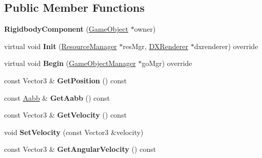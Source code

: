 \subsection*{Public Member Functions}
\begin{DoxyCompactItemize}
\item 
\mbox{\label{classRigidbodyComponent_ac10d3006d0d2324280f339f8adf3c5bc}} 
{\bfseries Rigidbody\+Component} (\hyperlink{classGameObject}{Game\+Object} $\ast$owner)
\item 
\mbox{\label{classRigidbodyComponent_a3fe46e628d20481031089e0e3e6bc6ee}} 
virtual void {\bfseries Init} (\hyperlink{classResourceManager}{Resource\+Manager} $\ast$res\+Mgr, \hyperlink{classDXRenderer}{D\+X\+Renderer} $\ast$dxrenderer) override
\item 
\mbox{\label{classRigidbodyComponent_af18ec4b42ca0c975e79f228fb515f2ac}} 
virtual void {\bfseries Begin} (\hyperlink{classGameObjectManager}{Game\+Object\+Manager} $\ast$go\+Mgr) override
\item 
\mbox{\label{classRigidbodyComponent_a6e0c112dd206b2f4cfe90941aeab110f}} 
const Vector3 \& {\bfseries Get\+Position} () const
\item 
\mbox{\label{classRigidbodyComponent_a383ec958d3a98df5b7870fb582834b14}} 
const \hyperlink{classAabb}{Aabb} \& {\bfseries Get\+Aabb} () const
\item 
\mbox{\label{classRigidbodyComponent_a11febd70a9d94963f6f7daf2f521b091}} 
const Vector3 \& {\bfseries Get\+Velocity} () const
\item 
\mbox{\label{classRigidbodyComponent_ab85528e62b5a1a81c5f6b9af821c6eb5}} 
void {\bfseries Set\+Velocity} (const Vector3 \&velocity)
\item 
\mbox{\label{classRigidbodyComponent_affcd899b87d83aa4147793481f17f5af}} 
const Vector3 \& {\bfseries Get\+Angular\+Velocity} () const
\item 
\mbox{\label{classRigidbodyComponent_afba758ae0f34f537aa207ec405dd947e}} 

\end{DoxyCompactItemize}
